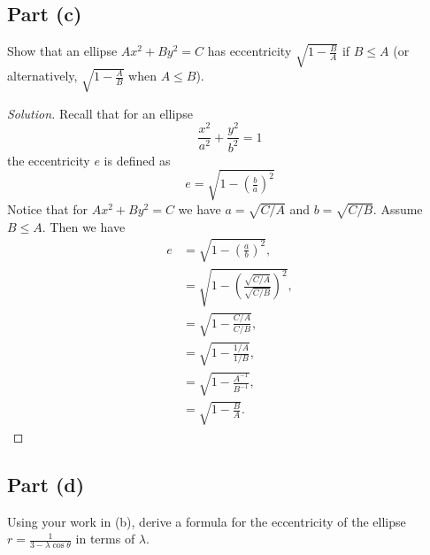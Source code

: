 \documentclass[letterpaper, 12pt]{amsart}
\theoremstyle{definition}  							%
\begin{document}
		\subsection*{Part (c)}
		Show that an ellipse $Ax^2 + By^2 = C$ has eccentricity $\sqrt{1 - \tfrac{B}{A}}$ if $B \leq A$ (or alternatively, $\sqrt{1 - \tfrac{A}{B}}$ when $A \leq B$).

		\begin{proof}[Solution]
		Recall that for an ellipse 
			\begin{equation}\label{ellipse}
				\frac{x^2}{a^2} + \frac{y^2}{b^2} = 1
			\end{equation}
		the eccentricity $e$ is defined as 
			\begin{equation}\label{eccentricity}
				e = \sqrt{1 - \left(\tfrac{b}{a}\right)^2}
			\end{equation}
		Notice that for $Ax^2 + By^2 = C$ we have $a = \sqrt{C/A}$ and $b = \sqrt{C/B}$.
		Assume $B \leq A$.
		Then we have 
			\begin{align*}
				e &= \sqrt{1 - \left(\tfrac{a}{b}\right)^2}, \\
				&= \sqrt{1 - \left( \frac{\sqrt{C/A}}{\sqrt{C/B}} \right)^2}, \\
				&= \sqrt{1 - \frac{C/A}{C/B}}, \\
				&= \sqrt{1 - \frac{1/A}{1/B}}, \\
				&= \sqrt{1 - \frac{A^{-1}}{B^{-1}}}, \\
				&= \sqrt{1 - \frac{B}{A}}.
			\end{align*}
		\end{proof}

		\subsection*{Part (d)}
		Using your work in (b), derive a formula for the eccentricity of the ellipse $r = \tfrac{1}{3-\lambda\cos\theta}$ in terms of $\lambda$.
\end{document}
